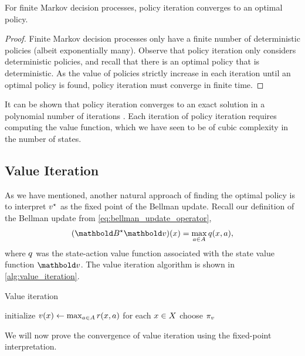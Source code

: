 \begin{thm}\label{thm:policy_iteration_convergence}
  For finite Markov decision processes, policy iteration converges to an optimal policy.
\end{thm}
\begin{proof}
  Finite Markov decision processes only have a finite number of deterministic policies (albeit exponentially many).
  Observe that policy iteration only considers deterministic policies, and recall that there is an optimal policy that is deterministic.
  As the value of policies strictly increase in each iteration until an optimal policy is found, policy iteration must converge in finite time.
\end{proof}

It can be shown that policy iteration converges to an exact solution in a polynomial number of iterations \citep{pi_convergence}.
Each iteration of policy iteration requires computing the value function, which we have seen to be of cubic complexity in the number of states.

\subsection{Value Iteration}

As we have mentioned, another natural approach of finding the optimal policy is to interpret $\fnv[\star]$ as the fixed point of the Bellman update.
Recall our definition of the Bellman update from \cref{eq:bellman_update_operator}, \begin{align*}
  (\mBs \vv)(x) = \max_{a \in \sA} \q{x}{a},
\end{align*} where $\fnq$ was the state-action value function associated with the state value function $\vv$.
The value iteration algorithm is shown in \cref{alg:value_iteration}.

\begin{algorithm}
  \caption{Value iteration}\label{alg:value_iteration}
  initialize $\v{x} \gets \max_{a \in \sA} r(x, a)$ for each $x \in X$\;
  choose $\pi_{\fnv}$\;
\end{algorithm}

We will now prove the convergence of value iteration using the fixed-point interpretation.

